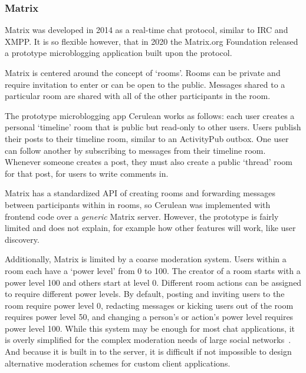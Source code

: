 \subsubsection{Matrix}

Matrix was developed in 2014 as a real-time chat protocol, similar to IRC and XMPP.
It is so flexible however, that in 2020 the Matrix.org Foundation released a prototype microblogging application built upon the protocol.

Matrix is centered around the concept of `rooms'.
Rooms can be private and require invitation to enter or can be open to the public.
Messages shared to a particular room are shared with all of the other participants in the room.

The prototype microblogging app Cerulean works as follows:
each user creates a personal `timeline' room that is public but read-only to other users. Users publish their posts to their timeline room, similar to an ActivityPub outbox. One user can follow another by subscribing to messages from their timeline room.
Whenever someone creates a post, they must also create a public `thread' room for that post, for users to write comments in.

Matrix has a standardized API of creating rooms and forwarding messages between participants within in rooms, so Cerulean was implemented with frontend code over a \emph{generic} Matrix server.
However, the prototype is fairly limited and does not explain, for example how other features will work, like user discovery.

Additionally, Matrix is limited by a coarse moderation system.
Users within a room each have a `power level' from 0 to 100.
The creator of a room starts with a power level 100 and others start at level 0.
Different room actions can be assigned to require different power levels. By default, posting and inviting users to the room require power level 0, redacting messages or kicking users out of the room requires power level 50, and changing a person's or action's power level requires power level 100.
While this system may be enough for most chat applications, it is overly simplified for the complex moderation needs of large social networks~\cite{policykit}.   And because it is built in to the server, it is difficult if not impossible to design alternative moderation schemes for custom client applications.


